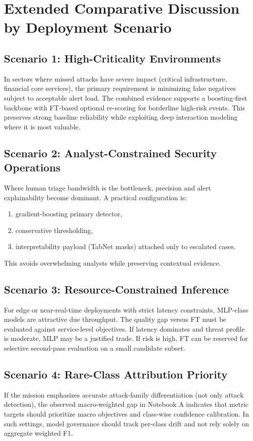 \documentclass[10pt,journal]{IEEEtran}
\begin{document}
\section{Extended Comparative Discussion by Deployment Scenario}
\subsection{Scenario 1: High-Criticality Environments}
In sectors where missed attacks have severe impact (critical infrastructure, financial core services), the primary requirement is minimizing false negatives subject to acceptable alert load. The combined evidence supports a boosting-first backbone with FT-based optional re-scoring for borderline high-risk events. This preserves strong baseline reliability while exploiting deep interaction modeling where it is most valuable.

\subsection{Scenario 2: Analyst-Constrained Security Operations}
Where human triage bandwidth is the bottleneck, precision and alert explainability become dominant. A practical configuration is:
\begin{enumerate}
\item gradient-boosting primary detector,
\item conservative thresholding,
\item interpretability payload (TabNet masks) attached only to escalated cases.
\end{enumerate}
This avoids overwhelming analysts while preserving contextual evidence.

\subsection{Scenario 3: Resource-Constrained Inference}
For edge or near-real-time deployments with strict latency constraints, MLP-class models are attractive due throughput. The quality gap versus FT must be evaluated against service-level objectives. If latency dominates and threat profile is moderate, MLP may be a justified trade. If risk is high, FT can be reserved for selective second-pass evaluation on a small candidate subset.

\subsection{Scenario 4: Rare-Class Attribution Priority}
If the mission emphasizes accurate attack-family differentiation (not only attack detection), the observed macro-weighted gap in Notebook A indicates that metric targets should prioritize macro objectives and class-wise confidence calibration. In such settings, model governance should track per-class drift and not rely solely on aggregate weighted F1.
\end{document}
